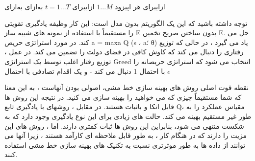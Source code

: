 ‌ازای{برای هر اپیزود 
$1...M$}
‌ازای{برای $t=1...T$}
  ‌به‌ازای
‌به‌ازای


توجه داشته باشید که این یک الگوریتم بدون مدل است: این کار وظیفه یادگیری تقویتی را مستقیماً با استفاده از نمونه های شبیه ساز E بدون ساختن صریح تخمین E. حل می کند.
در مورد استراتژی حریص a = maxa Q (s ، a؛ θ) یاد می گیرد ، در حالی که توزیع رفتاری را دنبال می کند که
کاوش کافی در فضای دولت را تضمین می کند. در عمل ، توزیع رفتار اغلب توسط یک استراتژی Greed انتخاب می شود که استراتژی حریصانه را با احتمال 1 دنبال می کند - و یک
اقدام تصادفی با احتمال $\epsilon$




نقطه قوت اصلی روش های بهینه سازی خط مشی، اصولی بودن آنهاست ، به این معنا که شما مستقیماً چیزی که می خواهید را بهینه سازی می کنید. در نتیجه این روش ها قابل اتکا و باثبات هستند. در مقابل ، روشهای 
با یادگیری تابع Q، مقیاس عملکرد را به طور غیر مستقیم بهینه می کند. حالت های زیادی برای این نوع یادگیری وجود دارد که به شکست منتهی می شود، بنابراین این روش ها  ثبات کمتری دارند. 
\cite{suttonbook}
اما ، روش های 
این مزیت را دارند که در هنگام کار ، به طور قابل ملاحظه ای کارآمد هستند ، زیرا آنها می توانند از داده ها به طور موثرتری نسبت به تکنیک های بهینه سازی خط مشی استفاده کنند.


